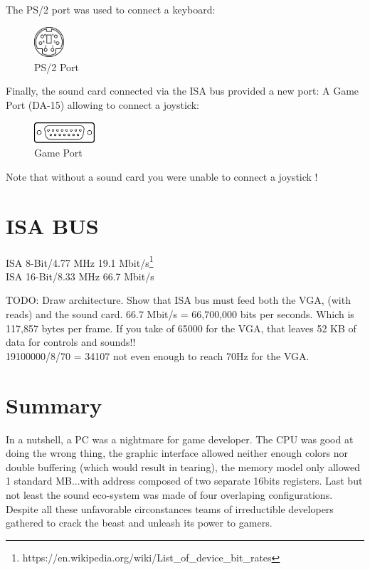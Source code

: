 \documentclass[book.tex]{subfiles}
\begin{document}
The PS/2 port was used to connect a keyboard:
 \begin{figure}[H]
\centering
\includegraphics[width=0.1\textwidth]{imgs/ports/MiniDIN-6_PS2.eps}
%
\caption{PS/2 Port}
\label{fig:ps2Port}
\end{figure}


Finally, the sound card connected via the ISA bus provided a new port: A Game Port (DA-15) allowing to connect a joystick:
 \begin{figure}[H]
\centering
\includegraphics[width=0.2\textwidth]{imgs/ports/DA-15_GamePort.eps}
%
\caption{Game Port}
\label{fig:gamePort}
\end{figure}

Note that without a sound card you were unable to connect a joystick !


\section{ISA BUS}

ISA 8-Bit/4.77 MHz  19.1 Mbit/s\footnote{https://en.wikipedia.org/wiki/List_of_device_bit_rates}\\
ISA 16-Bit/8.33 MHz 66.7 Mbit/s\\
\par
TODO: Draw architecture. Show that ISA bus must feed both the VGA, (with reads) and the sound card. 66.7 Mbit/s = 66,700,000 bits per seconds. Which is 117,857 bytes per frame. If you take of 65000 for the VGA, that leaves 52 KB of data for controls and sounds!!\\
19100000/8/70 = 34107 not even enough to reach 70Hz for the VGA.

\section{Summary}
In a nutshell, a PC was a nightmare for game developer. The CPU was good at doing the wrong thing, the graphic interface allowed neither enough colors nor double buffering (which would result in tearing), the memory model only allowed 1 standard MB...with address composed of two separate 16bits registers. Last but not least the sound eco-system was made of four overlaping configurations. Despite all these unfavorable circonstances teams of irreductible developers gathered to crack the beast and unleash its power to gamers.
\end{document}
